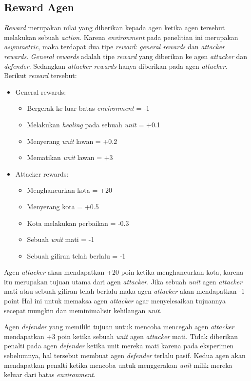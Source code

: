 \subsection{Reward Agen}
\emph{Reward} merupakan nilai yang diberikan kepada agen ketika agen tersebut melakukan sebuah \emph{action}.
Karena \emph{environment} pada penelitian ini merupakan \emph{asymmetric}, maka terdapat dua tipe \emph{reward}:
\emph{general rewards} dan \emph{attacker rewards}. 
\emph{General rewards} adalah tipe \emph{reward} yang diberikan ke agen \emph{attacker} dan \emph{defender}.
Sedangkan \emph{attacker rewards} hanya diberikan pada agen \emph{attacker}.
Berikut \emph{reward} tersebut:
\begin{itemize}
  \item General rewards: \begin{itemize}
      \item Bergerak ke luar batas \emph{environment} = -1
      \item Melakukan \emph{healing} pada sebuah \emph{unit} = +0.1
      \item Menyerang \emph{unit} lawan = +0.2
      \item Mematikan \emph{unit} lawan = +3
  \end{itemize}
  \item Attacker rewards: \begin{itemize}
      \item Menghancurkan kota = +20
      \item Menyerang kota = +0.5
      \item Kota melakukan perbaikan = -0.3
      \item Sebuah \emph{unit} mati = -1
      \item Sebuah giliran telah berlalu = -1
  \end{itemize}
\end{itemize}

Agen \emph{attacker} akan mendapatkan +20 poin ketika menghancurkan kota, karena itu merupakan tujuan utama dari agen \emph{attacker}.
Jika sebuah \emph{unit} agen \emph{attacker} mati atau sebuah giliran telah berlalu maka agen \emph{attacker} akan mendapatkan -1 point
Hal ini untuk memaksa agen \emph{attacker} agar menyelesaikan tujuannya secepat mungkin dan meminimalisir kehilangan \emph{unit}.

Agen \emph{defender} yang memiliki tujuan untuk mencoba mencegah agen \emph{attacker} mendapatkan +3 poin ketika sebuah \emph{unit}
agen \emph{attacker} mati. Tidak diberikan penalti pada agen \emph{defender} ketika unit mereka mati karena pada eksperimen sebelumnya,
hal tersebut membuat agen \emph{defender} terlalu pasif. Kedua agen akan mendapatkan penalti ketika mencoba untuk menggerakan \emph{unit}
milik mereka keluar dari batas \emph{environment}.


